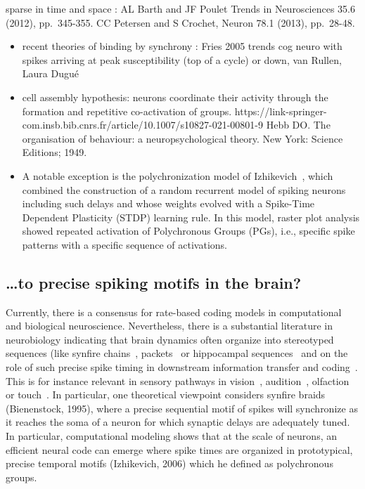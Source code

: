 \documentclass[brainsci, %
               review,submit,pdftex,moreauthors]{Definitions/mdpi}
\begin{document}
sparse in time and space : AL Barth and JF Poulet Trends in Neurosciences 35.6 (2012), pp.~345-355. 
CC Petersen and S Crochet, Neuron 78.1 (2013), pp.~28-48.

\begin{itemize}
\item
  recent theories of binding by synchrony : Fries 2005 trends cog neuro with spikes arriving at peak susceptibility (top of a cycle) or down, van Rullen, Laura Dugué
\item
  cell assembly hypothesis: neurons coordinate their activity through the formation and repetitive co-activation of groups. https://link-springer-com.insb.bib.cnrs.fr/article/10.1007/s10827-021-00801-9 Hebb DO. The organisation of behaviour: a neuropsychological theory. New York: Science Editions; 1949.
\item
  A notable exception is the polychronization model of Izhikevich~\citep{izhikevich_polychronization_2006}, which combined the construction of a random recurrent model of spiking neurons including such delays and whose weights evolved with a Spike-Time Dependent Plasticity (STDP) learning rule. In this model, raster plot analysis showed repeated activation of Polychronous Groups (PGs), i.e., specific spike patterns with a specific sequence of activations.
\end{itemize}

\subsection{\ldots to precise spiking motifs in the brain?}
%
Currently, there is a consensus for rate-based coding models in computational and biological neuroscience. Nevertheless, there is a substantial literature in neurobiology indicating that brain dynamics often organize into stereotyped sequences (like synfire chains~\citep{ikegaya_synfire_2004}, packets~\citep{luczak_sequential_2007} or hippocampal sequences~\citep{pastalkova_internally_2008,villette_internally_2015} and on the role of such precise spike timing in downstream information transfer and coding~\citep{villette_internally_2015,branco_dendritic_2010,luczak_packet-based_2015}. This is for instance relevant in sensory pathways in vision~\citep{meister_concerted_1995}, audition~\citep{decharms_primary_1996}, olfaction~\citep{wehr_odour_1996} or touch~\citep{johansson_first_2004}. In particular, one theoretical viewpoint considers synfire braids (Bienenstock, 1995), where a precise sequential motif of spikes will synchronize as it reaches the soma of a neuron for which synaptic delays are adequately tuned. In particular, computational modeling shows that at the scale of neurons, an efficient neural code can emerge where spike times are organized in prototypical, precise temporal motifs (Izhikevich, 2006) which he defined as polychronous groups.
\end{document}
